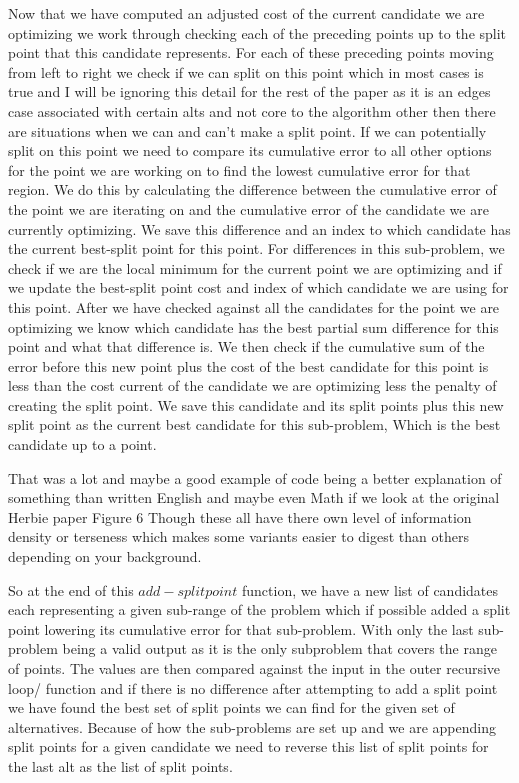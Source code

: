\documentclass{article}
\begin{document}
Now that we have computed an adjusted cost of the current candidate we are optimizing we work through checking each of the preceding points up to the split point that this candidate represents. For each of these preceding points moving from left to right we check if we can split on this point which in most cases is true and I will be ignoring this detail for the rest of the paper as it is an edges case associated with certain alts and not core to the algorithm other then there are situations when we can and can’t make a split point. If we can potentially split on this point we need to compare its cumulative error to all other options for the point we are working on to find the lowest cumulative error for that region. We do this by calculating the difference between the cumulative error of the point we are iterating on and the cumulative error of the candidate we are currently optimizing. We save this difference and an index to which candidate has the current best-split point for this point. For differences in this sub-problem, we check if we are the local minimum for the current point we are optimizing and if we update the best-split point cost and index of which candidate we are using for this point. After we have checked against all the candidates for the point we are optimizing we know which candidate has the best partial sum difference for this point and what that difference is. We then check if the cumulative sum of the error before this new point plus the cost of the best candidate for this point is less than the cost current of the candidate we are optimizing less the penalty of creating the split point. We save this candidate and its split points plus this new split point as the current best candidate for this sub-problem, Which is the best candidate up to a point.  

That was a lot and maybe a good example of code being a better explanation of something than written English and maybe even Math if we look at the original Herbie paper Figure 6 Though these all have there own level of information density or terseness which makes some variants easier to digest than others depending on your background. 

So at the end of this $add-splitpoint$ function, we have a new list of candidates each representing a given sub-range of the problem which if possible added a split point lowering its cumulative error for that sub-problem. With only the last sub-problem being a valid output as it is the only subproblem that covers the range of points. The values are then compared against the input in the outer recursive loop/ function and if there is no difference after attempting to add a split point we have found the best set of split points we can find for the given set of alternatives. Because of how the sub-problems are set up and we are appending split points for a given candidate we need to reverse this list of split points for the last alt as the list of split points.
\end{document}

